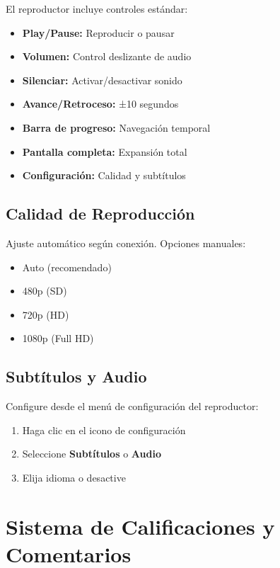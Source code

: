 \documentclass[11pt,a4paper,twoside]{book}
\begin{document}
El reproductor incluye controles estándar:

\begin{itemize}
    \item \textbf{Play/Pause:} Reproducir o pausar
    \item \textbf{Volumen:} Control deslizante de audio
    \item \textbf{Silenciar:} Activar/desactivar sonido
    \item \textbf{Avance/Retroceso:} ±10 segundos
    \item \textbf{Barra de progreso:} Navegación temporal
    \item \textbf{Pantalla completa:} Expansión total
    \item \textbf{Configuración:} Calidad y subtítulos
\end{itemize}

\section{Calidad de Reproducción}

Ajuste automático según conexión. Opciones manuales:
\begin{itemize}
    \item Auto (recomendado)
    \item 480p (SD)
    \item 720p (HD)
    \item 1080p (Full HD)
\end{itemize}

\section{Subtítulos y Audio}

Configure desde el menú de configuración del reproductor:
\begin{enumerate}
    \item Haga clic en el icono de configuración
    \item Seleccione \textbf{Subtítulos} o \textbf{Audio}
    \item Elija idioma o desactive
\end{enumerate}

\chapter{Sistema de Calificaciones y Comentarios}
\end{document}
